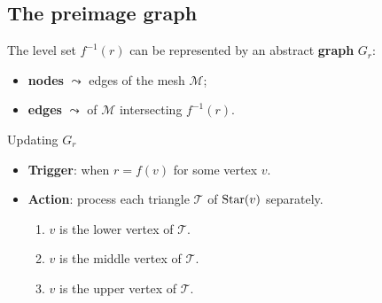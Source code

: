 \documentclass[10pt]{beamer}
\begin{document}
\subsection*{The preimage graph}
\begin{frame*}
The level set $f^{-1}(r)$ can be represented by an abstract \textbf{graph} $G_r$: %
\begin{itemize}
\item \textbf{nodes} $\leadsto$ edges of the mesh $\mathcal{M}$;
\item \textbf{edges} $\leadsto$  of $\mathcal{M}$ intersecting $f^{-1}(r)$.
\end{itemize}
\begin{block}{Updating $G_r$}
\begin{itemize}
\item \textbf{Trigger}:  when $r=f(v)$ for some vertex $v$.\\
\item \textbf{Action}: process each triangle $\mathcal{T}$ of $\operatorname{Star}(v)$ separately.
\begin{enumerate}
\item $v$ is the lower vertex of $\mathcal{T}$.
\item $v$ is the middle vertex of $\mathcal{T}$.
\item $v$ is the upper vertex of $\mathcal{T}$.
\end{enumerate}
\end{itemize}
\end{block}
\end{frame*}
\end{document}
